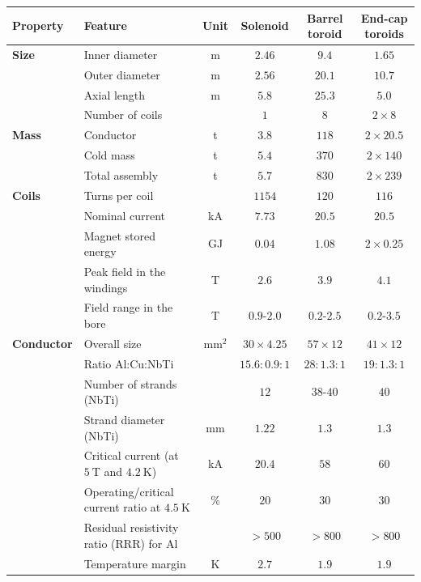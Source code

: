 \begin{table}[htbp]
	\centering
	\begin{tabular}{|l|l|c|c|c|c|}
		\hline
		\textbf{Property} & \textbf{Feature} & \textbf{Unit} & \textbf{Solenoid} & \textbf{Barrel toroid} & \textbf{End-cap toroids} \\
		\hline
		\textbf{Size} & Inner diameter & m & $2.46$ & $9.4$ & $1.65$ \\
		\hline
		 & Outer diameter & m & $2.56$ & $20.1$ & $10.7$ \\
		\hline
		 & Axial length & m & $5.8$ & $25.3$ & $5.0$ \\
		\hline
		 & Number of coils & & $1$ & $8$ & $2\times 8$ \\
		\hline
		\textbf{Mass} & Conductor & t & $3.8$ & $118$ & $2\times 20.5$ \\
		\hline
		 & Cold mass & t & $5.4$ & $370$ & $2\times 140$ \\
		\hline
		 & Total assembly & t & $5.7$ & $830$ & $2\times 239$ \\
		\hline
		\textbf{Coils} & Turns per coil & & $1154$ & $120$ & $116$ \\
		\hline
		 & Nominal current & kA & $7.73$ & $20.5$ & $20.5$ \\
		\hline
		 & Magnet stored energy & GJ & $0.04$ & $1.08$ & $2\times 0.25$ \\
		\hline
		 & Peak field in the windings & T & $2.6$ & $3.9$ & $4.1$ \\
		\hline
		 & Field range in the bore & T & $0.9$-$2.0$ & $0.2$-$2.5$ & $0.2$-$3.5$ \\
		\hline
		\textbf{Conductor} & Overall size & mm$^2$ & $30\times 4.25$ & $57\times12$ & $41\times 12$ \\
		\hline
		 & Ratio Al:Cu:NbTi & & $15.6:0.9:1$ & $28:1.3:1$ & $19:1.3:1$ \\
		\hline
		 & Number of strands (NbTi) & & $12$ & $38$-$40$ & $40$ \\
		\hline
		 & Strand diameter (NbTi) & mm & $1.22$ & $1.3$ & $1.3$ \\
		\hline
		 & Critical current (at $5~\mbox{T}$ and $4.2~\mbox{K}$) & kA & $20.4$ & $58$ & $60$ \\
		\hline
		 & Operating/critical current ratio at $4.5~\mbox{K}$ & \% & $20$ & $30$ & $30$ \\
		\hline
		 & Residual resistivity ratio (RRR) for Al & & $>500$ & $>800$ & $>800$ \\
		\hline
		 & Temperature margin & K & $2.7$ & $1.9$ & $1.9$ \\

\end{tabular}
\end{table}

